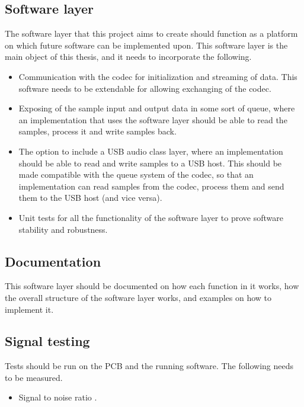\subsection{Software layer}

The software layer that this project aims to create should function as a platform on which future 
software can be implemented upon.
This software layer is the main object of this thesis, and it needs to incorporate the following.

\begin{itemize}
	\item Communication with the codec for initialization and streaming of data. This software needs to 
	be extendable for allowing exchanging of the codec.
	\item Exposing of the sample input and output data in some sort of queue, where an implementation 
	that uses the software layer should 
	be able to read the samples, process it and write samples back.
	\item The option to include a USB audio class layer, where an implementation should be able to read 
	and write samples to a USB host. 
	This should be made compatible with the queue system of the codec, so that an implementation can 
	read samples from the codec, 
	process them and send them to the USB host (and vice versa).
	\item Unit tests for all the functionality of the software layer to prove software stability and 
	robustness.
\end{itemize}

\subsection{Documentation}

This software layer should be documented on how each function in it works, how the overall structure of 
the software layer works, and examples on how to implement it.

\subsection{Signal testing}

Tests should be run on the PCB and the running software. The following needs to be measured.

\begin{itemize}
	\item Signal to noise ratio .
\end{itemize}
